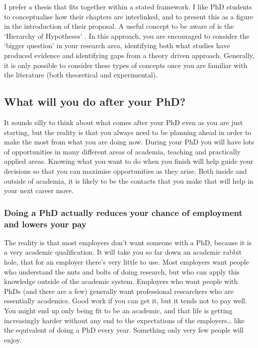 \documentclass[
]{krantz}
\begin{document}
I prefer a thesis that fits together within a stated framework. I like PhD students to conceptualise how their chapters are interlinked, and to present this as a figure in the introduction of their proposal. A useful concept to be aware of is the `Hierarchy of Hypotheses' \citep{heger2018hierarchy}. In this approach, you are encouraged to consider the `bigger question' in your research area, identifying both what studies have produced evidence and identifying gaps from a theory driven approach. Generally, it is only possible to consider these types of concepts once you are familiar with the literature (both theoretical and experimental).

\hypertarget{what-will-you-do-after-your-phd}{%
\subsection{What will you do after your PhD?}\label{what-will-you-do-after-your-phd}}

It sounds silly to think about what comes after your PhD even as you are just starting, but the reality is that you always need to be planning ahead in order to make the most from what you are doing now. During your PhD you will have lots of opportunities in many different areas of academia, teaching and practically applied areas. Knowing what you want to do when you finish will help guide your decisions so that you can maximise opportunities as they arise. Both inside and outside of academia, it is likely to be the contacts that you make that will help in your next career move.

\hypertarget{doing-a-phd-actually-reduces-your-chance-of-employment-and-lowers-your-pay}{%
\subsubsection{Doing a PhD actually reduces your chance of employment and lowers your pay}\label{doing-a-phd-actually-reduces-your-chance-of-employment-and-lowers-your-pay}}

The reality is that most employers don't want someone with a PhD, because it is a very academic qualification. It will take you so far down an academic rabbit hole, that for an employer there's very little to use. Most employers want people who understand the nuts and bolts of doing research, but who can apply this knowledge outside of the academic system. Employers who want people with PhDs (and there are a few) generally want professional researchers who are essentially academics. Good work if you can get it, but it tends not to pay well. You might end up only being fit to be an academic, and that life is getting increasingly harder without any end to the expectations of the employers\ldots{} like the equivalent of doing a PhD every year. Something only very few people will enjoy.
\end{document}
